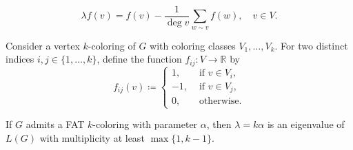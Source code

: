 \documentclass[10pt,a4paper]{amsart}
\newcommand{\R}{\mathbb{R}}
\begin{document}
\begin{equation}\label{eq:eigenpair}
    \lambda f(v) = f(v) - \frac{1}{\deg v}\sum_{w\sim v} f(w), \quad v\in V.
\end{equation}

\begin{definition}\label{def:f_ij}
   Consider a vertex $k$-coloring of $G$ with coloring classes $V_1,\ldots,V_k$. For two distinct indices $i,j\in\{1,\ldots,k\}$, define the function $f_{ij}\colon V\to\R$ by
    \[
    f_{ij}(v) \coloneqq \begin{cases}
        1, &\text{ if } v\in V_i,\\
        -1, &\text{ if } v\in V_j,\\
        0, &\text{ otherwise.}
    \end{cases}
    \]
\end{definition}

\begin{theorem}\label{thm:lambda}
    If $G$ admits a FAT $k$-coloring with parameter $\alpha$, then $\lambda=k\alpha$ is an eigenvalue of $L(G)$ with multiplicity at least $\max\{1,k-1\}$.
\end{theorem}
\end{document}
